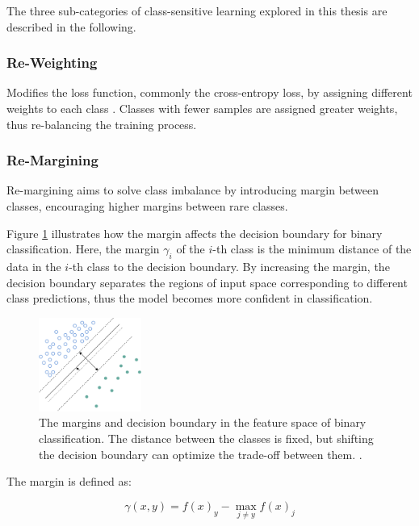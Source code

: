 The three sub-categories of class-sensitive learning explored in this thesis are described in the following.

\subsubsection{Re-Weighting}
\label{sec:re-weighting}
Modifies the loss function, commonly the cross-entropy loss, by assigning different weights to each class \cite{zhang2023deep}. Classes with fewer samples are assigned greater weights, thus re-balancing the training process.

\subsubsection{Re-Margining}
\label{sec:re-margining}
Re-margining aims to solve class imbalance by introducing margin between classes, encouraging higher margins between rare classes. 

Figure \ref{fig:decision_boundaries} illustrates how the margin affects the decision boundary for binary classification. Here, the margin $\gamma_i$ of the $i$-th class is the minimum distance of the data in the $i$-th class to the decision boundary.  By increasing the margin, the decision boundary separates the regions of input space corresponding to different class predictions, thus the model becomes more confident in classification.


\begin{figure}[ht]
    \centering
    \includegraphics[width=0.3\textwidth]{Images/margin.drawio.png} 
    \caption{The margins and decision boundary in the feature space of binary classification. The distance between the classes is fixed, but shifting the decision boundary can optimize the trade-off between them. \cite{cao2019learningimbalanceddatasetslabeldistributionaware}.}
    \label{fig:decision_boundaries} 
\end{figure}

\noindent The margin is defined as:

\begin{equation}
    \label{eq:margin_def}
    \gamma(x,y) = f(x)_y - \max_{j \neq y}f(x)_j
\end{equation}

